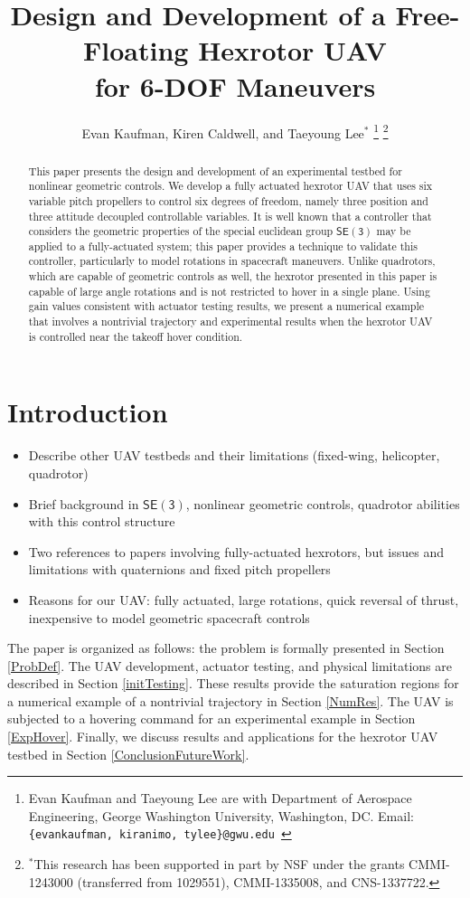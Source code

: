 \documentclass[letterpaper, 10pt, conference]{ieeeconf}
\title{\LARGE \bf
Design and Development of a Free-Floating Hexrotor UAV \\ for 6-DOF Maneuvers }
\author{Evan Kaufman, Kiren Caldwell, and Taeyoung Lee$^*$
 \thanks{Evan Kaufman and Taeyoung Lee are with Department of Aerospace Engineering, George Washington University, Washington, DC. Email: {\tt\footnotesize \{evankaufman, kiranimo, tylee\}@gwu.edu }}
\thanks{$^*$This research has been supported in part by NSF under the grants CMMI-1243000 (transferred from 1029551), CMMI-1335008, and CNS-1337722.}}
\newcommand{\SE}{\ensuremath{\mathsf{SE(3)}}}
\begin{document}
\allowdisplaybreaks


\maketitle \thispagestyle{empty} \pagestyle{empty}

\begin{abstract}
This paper presents the design and development of an experimental testbed for nonlinear geometric controls. We develop a fully actuated hexrotor UAV that uses six variable pitch propellers to control six degrees of freedom, namely three position and three attitude decoupled controllable variables. It is well known that a controller that considers the geometric properties of the special euclidean group $\SE$ may be applied to a fully-actuated system; this paper provides a technique to validate this controller, particularly to model rotations in spacecraft maneuvers. Unlike quadrotors, which are capable of geometric controls as well, the hexrotor presented in this paper is capable of large angle rotations and is not restricted to hover in a single plane. Using gain values consistent with actuator testing results, we present a numerical example that involves a nontrivial trajectory and experimental results when the hexrotor UAV is controlled near the takeoff hover condition.
\end{abstract}


\section{Introduction}

\begin{itemize}
\item Describe other UAV testbeds and their limitations (fixed-wing, helicopter, quadrotor)
\item Brief background in $\SE$, nonlinear geometric controls, quadrotor abilities with this control structure
\item Two references to papers involving fully-actuated hexrotors, but issues and limitations with quaternions and fixed pitch propellers
\item Reasons for our UAV: fully actuated, large rotations, quick reversal of thrust, inexpensive to model geometric spacecraft controls
\end{itemize}

The paper is organized as follows: the problem is formally presented in Section \ref{ProbDef}.
The UAV development, actuator testing, and physical limitations are described in Section \ref{initTesting}.
These results provide the saturation regions for a numerical example of a nontrivial trajectory in Section \ref{NumRes}.
The UAV is subjected to a hovering command for an experimental example in Section \ref{ExpHover}.
Finally, we discuss results and applications for the hexrotor UAV testbed in Section \ref{ConclusionFutureWork}.
\end{document}
